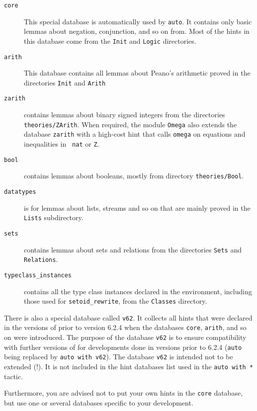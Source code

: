 \begin{description}

\item[\tt core] This special database is automatically used by
  \texttt{auto}. It contains only basic lemmas about negation,
  conjunction, and so on from. Most of the hints in this database come 
  from the \texttt{Init} and \texttt{Logic} directories.

\item[\tt arith] This database contains all lemmas about Peano's
  arithmetic proved in the directories \texttt{Init} and
  \texttt{Arith}

\item[\tt zarith] contains lemmas about binary signed integers from
  the directories \texttt{theories/ZArith}. When required, the module
  {\tt Omega} also extends the database {\tt zarith} with a high-cost
  hint that calls {\tt omega} on equations and inequalities in {\tt
  nat} or {\tt Z}.

\item[\tt bool] contains lemmas about booleans, mostly from directory
  \texttt{theories/Bool}.

\item[\tt datatypes] is for lemmas about lists, streams and so on that 
  are mainly proved in the \texttt{Lists} subdirectory.

\item[\tt sets] contains lemmas about sets and relations from the 
  directories \texttt{Sets} and \texttt{Relations}.

\item[\tt typeclass\_instances] contains all the type class instances
  declared in the environment, including those used for \texttt{setoid\_rewrite},
  from the \texttt{Classes} directory.
\end{description}

There is also a special database called {\tt v62}. It collects all
hints that were declared in the versions of {\Coq} prior to version
6.2.4 when the databases {\tt core}, {\tt arith}, and so on were
introduced.  The purpose of the database {\tt v62} is to ensure
compatibility with further versions of {\Coq} for developments done in
versions prior to 6.2.4 ({\tt auto} being replaced by {\tt auto with v62}).
The database {\tt v62} is intended not to be extended (!). It is not
included in the hint databases list used in the {\tt auto with *} tactic.

Furthermore, you are advised not to put your own hints in the
{\tt core} database, but use one or several databases specific to your
development.

